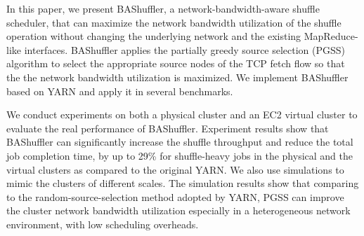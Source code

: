 \documentclass[10pt,journal,compsoc]{IEEEtran}
\begin{document}
In this paper, 
we present BAShuffler, a network-bandwidth-aware shuffle scheduler, 
that can maximize the network bandwidth utilization of the shuffle operation
without changing the underlying network and the existing MapReduce-like interfaces. 
BAShuffler applies the partially
greedy source selection (PGSS) algorithm
to select the appropriate source nodes of the TCP fetch flow so that 
the the network bandwidth utilization is maximized. 
We implement BAShuffler based on YARN and apply it in
several benchmarks.

We conduct experiments on both a physical cluster and an EC2
virtual cluster to evaluate the real performance of BAShuffler. 
Experiment results show that BAShuffler can significantly increase the
shuffle throughput
and reduce the total job completion time, by up to 29\% for
shuffle-heavy jobs in the physical and the virtual clusters
as compared to the original YARN. 
We also use simulations to mimic the clusters of different scales. 
The simulation results show that comparing to the
random-source-selection method adopted by YARN, 
PGSS can improve the cluster network bandwidth
utilization especially in a heterogeneous network environment, with low scheduling overheads.
\end{document}

